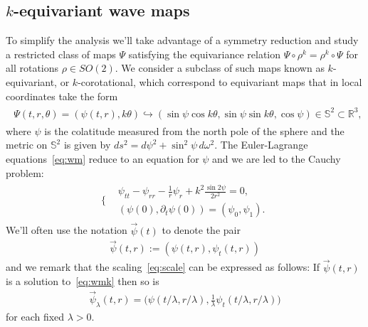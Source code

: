 \documentclass[10pt,reqno]{amsart}
\newcommand{\red}[1]{\textcolor{red}{#1}}
\newcommand{\M}{\mathcal{M}}
\newcommand{\R}{\mathbb{R}}
\newcommand{\Sp}{\mathbb{S}}
\newcommand{\om}{\omega}
\newcommand{\la}{\lambda}
\newcommand{\te}{\theta}
\newcommand{\p}{\partial}
\newcommand{\ant}[1]{\begin{align*}\begin{split} #1 \end{split}\end{align*}}
\newcommand{\EQ}[1]{\begin{equation}\begin{split} #1 \end{split}\end{equation}}
\numberwithin{equation}{section}
\theoremstyle{remark}
\newcommand{\rst}{\!\upharpoonright}
\newcommand{\0}{\emptyset}
\begin{document}
\subsection{$k$-equivariant wave maps} 
To simplify the analysis we'll take advantage of a symmetry reduction and study a restricted class of maps  $\Psi$ satisfying the equivariance relation $\Psi \circ \rho^k = \rho^k \circ \Psi$ for all rotations $\rho \in SO(2)$.
We consider a subclass of such maps known as $k$-equivariant, or $k$-corotational, which correspond to equivariant maps that in local coordinates take the form
\ant{
\Psi(t, r, \theta) = (\psi(t, r), k \te ) \hookrightarrow ( \sin \psi \cos k\theta , \sin \psi \sin  k \theta, \cos \psi) \in \Sp^2 \subset \R^3,
}
where $\psi$ is the colatitude measured from the north pole of the sphere and the metric on $\Sp^2$ is given by $ds^2 = d \psi^2+ \sin^2 \psi\,  d \om^2$.  
The Euler-Lagrange equations~\eqref{eq:wm} reduce to an equation for $\psi$ and we are led to the Cauchy problem:
\EQ{ \label{eq:wmk}
\Bigg\{\begin{aligned}
&\psi_{tt} -  \psi_{rr}  - \frac{1}{r} \psi_r + k^2  \frac{\sin 2 \psi}{2r^2} = 0, \\ 
&(\psi(0), \partial_t \psi(0)) = (\psi_0, \psi_1).
\end{aligned}
}
We'll often use the notation $\vec \psi(t)$ to denote the pair 
\EQ{
\vec \psi(t, r):= ( \psi(t, r), \psi_t(t, r))
}
and we remark that the scaling~\eqref{eq:scale} can be expressed as follows:   If $\vec \psi(t, r)$ is a solution to~\eqref{eq:wmk} then so is 
 \EQ{
 \vec \psi_\la(t, r)  = \Big(\psi( t/ \la, r/ \la), \frac{1}{\la} \psi_t(t/ \la, r/ \la)\Big)
 }
for each fixed $\la>0$. 
%
\end{document}
